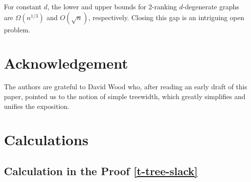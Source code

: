 \documentclass[kpfonts]{patmorin}
\theoremstyle{named}
\begin{document}
For constant $d$, the lower and upper bounds for 2-ranking $d$-degenerate graphs are $\Omega(n^{1/3})$ and $O(\sqrt{n})$, respectively.  Closing this gap is an intriguing open problem.

\section*{Acknowledgement}

The authors are grateful to David Wood who, after reading an early draft of this paper, pointed us to the notion of simple treewidth, which greatly simplifies and unifies the exposition.





\appendix
\section{Calculations}
\label{calculation}

\subsection{Calculation in the Proof \cref{t-tree-slack}}
\label{calculation-i}
\end{document}
